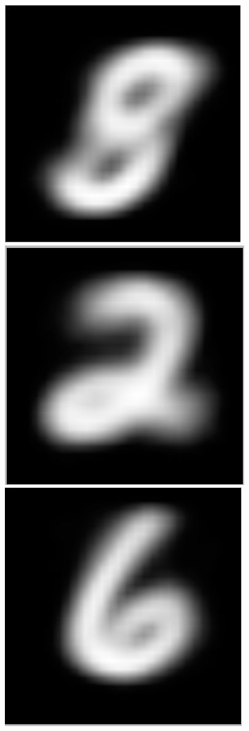 \documentclass[submit]{harvardml}
\begin{document}
 	\begin{figure}[h]
		\includegraphics[scale=0.1]{./m5/0}
		\includegraphics[scale=0.1]{./m5/1}
		\includegraphics[scale=0.1]{./m5/2}

\end{figure}
\end{document}
